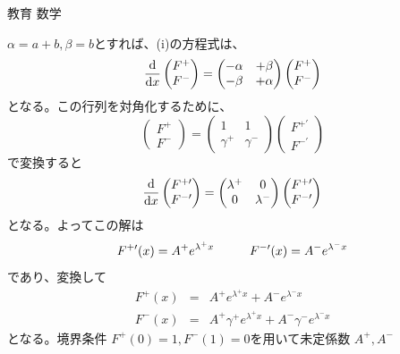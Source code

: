 \documentclass[fleqn]{jbook}
\begin{document}
\begin{answer}{教育 数学}{}
\begin{subanswers}
\begin{subsubanswers}
  \SubSubAnswer
    $\alpha=a+b,\beta=b$とすれば、(i)の方程式は、
%
    \[ \Deriver{}{x} \begin{pmatrix}%
         F^+ \\ F^-
       \end{pmatrix}
       =%
       \begin{pmatrix}%
         -\alpha & +\beta  \\ 
         -\beta  & +\alpha
       \end{pmatrix}%
       \begin{pmatrix}%
         F^+ \\ F^-
       \end{pmatrix} \]
%
    となる。この行列を対角化するために、
%
    \[ \begin{pmatrix}%
         F^+ \\ F^-
       \end{pmatrix}%
       =%
       \begin{pmatrix}%
         1          & 1          \\
         \gamma^{+} & \gamma^{-}
       \end{pmatrix}%
       \begin{pmatrix}%
         F^{+\prime} \\ F^{-\prime}
       \end{pmatrix}%
    \]
%
    で変換すると
%
    \[ \Deriver{}{x} \begin{pmatrix}%
         F^{+\prime} \\ F^{-\prime}
       \end{pmatrix}%
       =%
       \begin{pmatrix}%
         \lambda^+ & 0 \\
         0 & \lambda^-
       \end{pmatrix}%
       \begin{pmatrix}%
         F^{+\prime} \\ F^{-\prime}
       \end{pmatrix} \]
%
    となる。よってこの解は
%
    \[ F^{+\prime}(x) = A^+ e^{\lambda^+ x} \hspace{10mm}%
       F^{-\prime}(x) = A^- e^{\lambda^- x} \]
%
    であり、変換して
%
    \begin{eqnarray*}
      F^+(x) &=& A^+ e^{\lambda^+x} + A^- e^{\lambda^-x} \\
      F^-(x) &=& A^+\gamma^+e^{\lambda^+x}+A^-\gamma^-e^{\lambda^-x}
    \end{eqnarray*}
%
    となる。境界条件 $F^+(0)=1,F^-(1)=0$を用いて未定係数 $A^+,A^-$

\end{subsubanswers}
\end{subanswers}
\end{answer}
\end{document}
